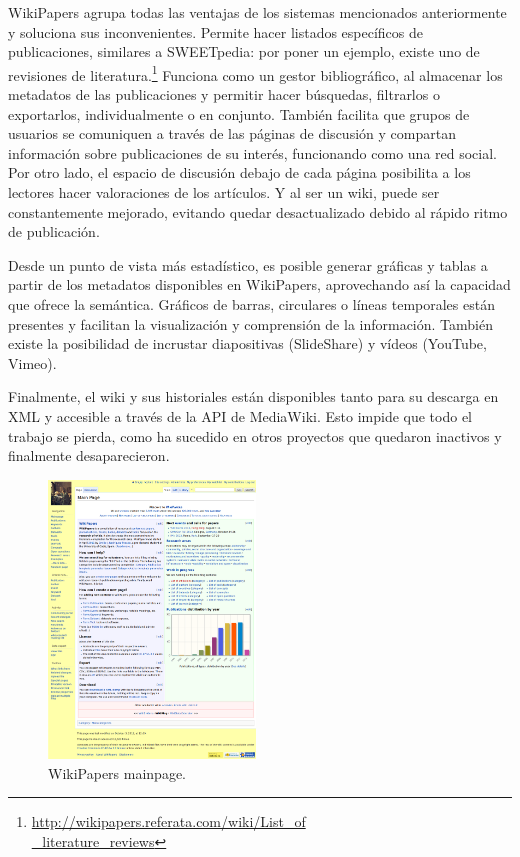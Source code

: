 \documentclass[11pt,twocolumn]{article}
\begin{document}
WikiPapers agrupa todas las ventajas de los sistemas mencionados anteriormente y soluciona sus inconvenientes. Permite hacer listados específicos de publicaciones, similares a SWEETpedia: por poner un ejemplo, existe uno de revisiones de literatura.\footnote{\href{http://wikipapers.referata.com/wiki/List_of_literature_reviews}{http://wikipapers.referata.com/wiki/List\_of\\ \_literature\_reviews}} Funciona como un gestor bibliográfico, al almacenar los metadatos de las publicaciones y permitir hacer búsquedas, filtrarlos o exportarlos, individualmente o en conjunto. También facilita que grupos de usuarios se comuniquen a través de las páginas de discusión y compartan información sobre publicaciones de su interés, funcionando como una red social. Por otro lado, el espacio de discusión debajo de cada página posibilita a los lectores hacer valoraciones de los artículos. Y al ser un wiki, puede ser constantemente mejorado, evitando quedar desactualizado debido al rápido ritmo de publicación.

Desde un punto de vista más estadístico, es posible generar gráficas y tablas a partir de los metadatos disponibles en WikiPapers, aprovechando así la capacidad que ofrece la semántica. Gráficos de barras, circulares o líneas temporales están presentes y facilitan la visualización y comprensión de la información. También existe la posibilidad de incrustar diapositivas (SlideShare) y vídeos (YouTube, Vimeo).

Finalmente, el wiki y sus historiales están disponibles tanto para su descarga en XML y accesible a través de la API de MediaWiki. Esto impide que todo el trabajo se pierda, como ha sucedido en otros proyectos que quedaron inactivos y finalmente desaparecieron.

\begin{figure}[htb]
\centering
\includegraphics[width=0.49\textwidth]{wpfull.png}
\caption{WikiPapers mainpage.}
\label{fig:wpfull}
\end{figure}
\end{document}
